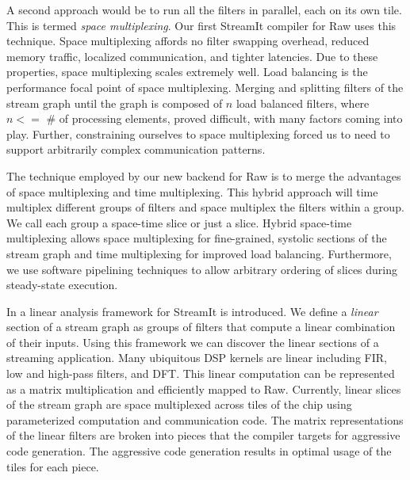 \documentclass{csailabstractbook}
\begin{document}
A second approach would be to run all the filters in parallel, each on
its own tile.  This is termed {\it space multiplexing}.  Our first 
StreamIt compiler for Raw uses this technique.  Space multiplexing
affords no filter swapping overhead, reduced memory traffic,
localized communication, and tighter latencies.  Due to these
properties, space multiplexing scales extremely well.  
Load balancing is the performance focal point of space multiplexing.  Merging
and splitting filters of the stream graph until the graph is composed
of $n$ load balanced filters, where $n <=$ \# of processing
elements, proved difficult, with many factors coming into play.  
Further, constraining ourselves to space multiplexing forced us to
need to support arbitrarily complex communication patterns.

The technique employed by our new backend for Raw is to merge the
advantages of space multiplexing and time multiplexing.  This hybrid
approach will time multiplex different groups of filters and space
multiplex the filters within a group. We call each group a space-time
slice or just a slice.  Hybrid space-time multiplexing allows space
multiplexing for fine-grained, systolic sections of the stream graph
 and time
multiplexing for improved load balancing.  Furthermore, we use
software pipelining techniques to allow arbitrary ordering of slices
during steady-state execution.

In \cite{lamb03} a linear analysis framework for StreamIt is
introduced.  We define a {\it linear} section of a stream graph as
groups of filters that compute a linear combination of their inputs.
Using this framework we can discover the linear sections of a
streaming application.  Many ubiquitous DSP kernels are linear
including FIR, low and high-pass filters, and DFT.  This linear
computation can be represented as a matrix multiplication and
efficiently mapped to Raw.  Currently, linear slices of the stream
graph are space multiplexed across tiles of the chip using
parameterized computation and communication code.  The matrix
representations of the linear filters are broken into pieces
that the compiler targets for aggressive code generation.  The
aggressive code generation results in optimal usage of the tiles
for each piece.
\end{document}
